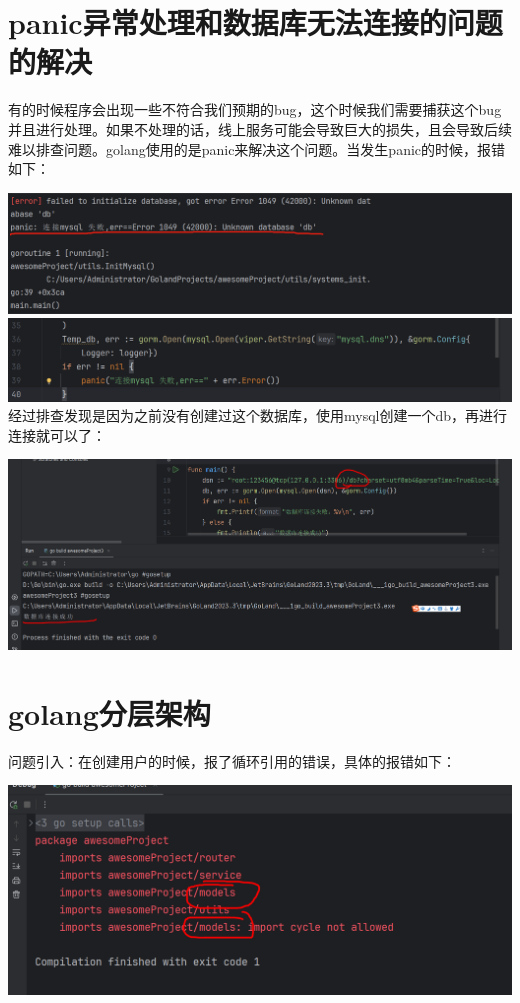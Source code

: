 \documentclass[12pt]{article}
\begin{document}
	\section{panic异常处理和数据库无法连接的问题的解决}
	有的时候程序会出现一些不符合我们预期的bug，这个时候我们需要捕获这个bug并且进行处理。如果不处理的话，线上服务可能会导致巨大的损失，且会导致后续难以排查问题。golang使用的是panic来解决这个问题。当发生panic的时候，报错如下：
	
	\includegraphics[scale=0.5]{3.png}
	\includegraphics[scale=0.5]{4.png}
	经过排查发现是因为之前没有创建过这个数据库，使用mysql创建一个db，再进行连接就可以了：
	
	\includegraphics[scale=0.5]{5.png}
	
	\section{golang分层架构}
	问题引入：在创建用户的时候，报了循环引用的错误，具体的报错如下：
	
	\includegraphics{6.png}
	
\end{document}

